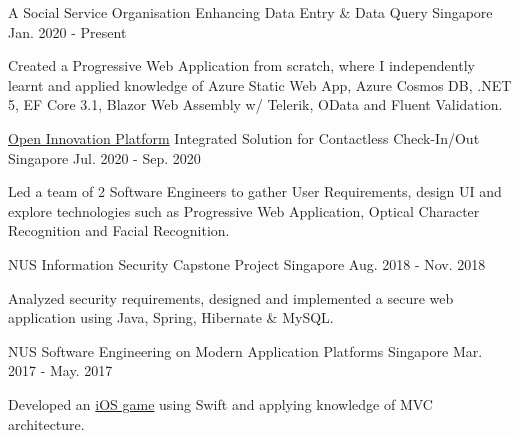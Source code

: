 

\begin{cventries}

  \cventry
    {A Social Service Organisation} %
    {Enhancing Data Entry \& Data Query} %
    {Singapore} %
    {Jan. 2020 - Present} %
    {
      \begin{cvitems} %
        \item {Created a Progressive Web Application from scratch, where I independently learnt and applied knowledge of Azure Static Web App, Azure Cosmos DB, .NET 5, EF Core 3.1, Blazor Web Assembly w/ Telerik, OData and Fluent Validation.}
      \end{cvitems}
    }

  \cventry
    {\href{https://www.openinnovation.sg/about}{Open Innovation Platform}} %
    {Integrated Solution for Contactless Check-In/Out} %
    {Singapore} %
    {Jul. 2020 - Sep. 2020} %
    {
      \begin{cvitems} %
        \item {Led a team of 2 Software Engineers to gather User Requirements, design UI and explore technologies such as Progressive Web Application, Optical Character Recognition and Facial Recognition.}
      \end{cvitems}
    }

  \cventry
    {NUS} %
    {Information Security Capstone Project} %
    {Singapore} %
    {Aug. 2018 - Nov. 2018} %
    {
      \begin{cvitems} %
        \item {Analyzed security requirements, designed and implemented a secure web application using Java, Spring, Hibernate \& MySQL.}
      \end{cvitems}
    }

  \cventry
    {NUS} %
    {Software Engineering on Modern Application Platforms} %
    {Singapore} %
    {Mar. 2017 - May. 2017} %
    {
      \begin{cvitems} %
        \item {Developed an \href{https://github.com/Zhiyuan-Amos/Train-to-Changi}{iOS game} using Swift and applying knowledge of MVC architecture.}
      \end{cvitems}
    }


\end{cventries}
